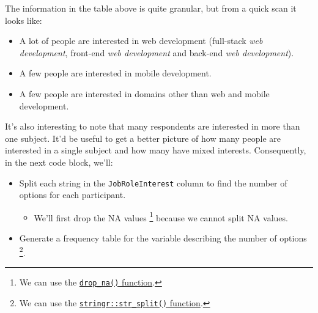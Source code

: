 \documentclass[
]{article}
\providecommand{\tightlist}{%
  \setlength{\itemsep}{0pt}\setlength{\parskip}{0pt}}
\begin{document}
The information in the table above is quite granular, but from a quick
scan it looks like:

\begin{itemize}
\tightlist
\item
  A lot of people are interested in web development (full-stack
  \emph{web development}, front-end \emph{web development} and back-end
  \emph{web development}).
\item
  A few people are interested in mobile development.
\item
  A few people are interested in domains other than web and mobile
  development.
\end{itemize}

It's also interesting to note that many respondents are interested in
more than one subject. It'd be useful to get a better picture of how
many people are interested in a single subject and how many have mixed
interests. Consequently, in the next code block, we'll:

\begin{itemize}
\tightlist
\item
  Split each string in the \texttt{JobRoleInterest} column to find the
  number of options for each participant.

  \begin{itemize}
  \tightlist
  \item
    We'll first drop the NA values \footnote{We can use the
      \href{https://tidyr.tidyverse.org/reference/drop_na.html}{\texttt{drop\_na()}
      function}.} because we cannot split NA values.
  \end{itemize}
\item
  Generate a frequency table for the variable describing the number of
  options \footnote{We can use the
    \href{https://www.rdocumentation.org/packages/stringr/versions/1.4.1/topics/str_split}{\texttt{stringr::str\_split()}
    function}.}.
\end{itemize}
\end{document}
